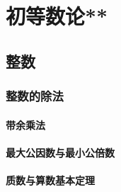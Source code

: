 \part{初等数论**}
\chapter{整数}
\section{整数的除法}
\subsection{带余乘法}
\clearpage
\subsection{最大公因数与最小公倍数}
\clearpage
\subsection{质数与算数基本定理}
\clearpage
